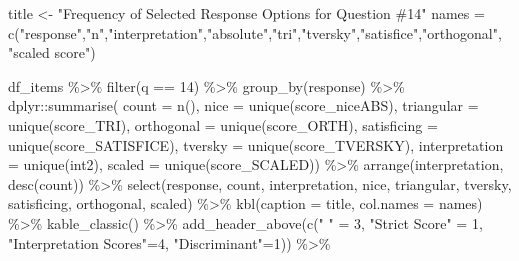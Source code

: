 \documentclass[
  letterpaper,
  DIV=11,
  numbers=noendperiod]{scrreprt}
\newenvironment{Shaded}{\begin{snugshade}}{\end{snugshade}}
\newcommand{\AttributeTok}[1]{\textcolor[rgb]{0.40,0.45,0.13}{#1}}
\newcommand{\DecValTok}[1]{\textcolor[rgb]{0.68,0.00,0.00}{#1}}
\newcommand{\FunctionTok}[1]{\textcolor[rgb]{0.28,0.35,0.67}{#1}}
\newcommand{\NormalTok}[1]{\textcolor[rgb]{0.00,0.23,0.31}{#1}}
\newcommand{\OtherTok}[1]{\textcolor[rgb]{0.00,0.23,0.31}{#1}}
\newcommand{\SpecialCharTok}[1]{\textcolor[rgb]{0.37,0.37,0.37}{#1}}
\newcommand{\StringTok}[1]{\textcolor[rgb]{0.13,0.47,0.30}{#1}}
\begin{document}
\begin{Shaded}
\begin{Highlighting}[]
\NormalTok{title }\OtherTok{\textless{}{-}} \StringTok{"Frequency of Selected Response Options for Question \#14"}
\NormalTok{names }\OtherTok{=} \FunctionTok{c}\NormalTok{(}\StringTok{"response"}\NormalTok{,}\StringTok{"n"}\NormalTok{,}\StringTok{"interpretation"}\NormalTok{,}\StringTok{"absolute"}\NormalTok{,}\StringTok{"tri"}\NormalTok{,}\StringTok{"tversky"}\NormalTok{,}\StringTok{"satisfice"}\NormalTok{,}\StringTok{"orthogonal"}\NormalTok{, }\StringTok{"scaled score"}\NormalTok{)}

\NormalTok{df\_items }\SpecialCharTok{\%\textgreater{}\%} \FunctionTok{filter}\NormalTok{(q }\SpecialCharTok{==} \DecValTok{14}\NormalTok{) }\SpecialCharTok{\%\textgreater{}\%} \FunctionTok{group\_by}\NormalTok{(response) }\SpecialCharTok{\%\textgreater{}\%}
\NormalTok{  dplyr}\SpecialCharTok{::}\FunctionTok{summarise}\NormalTok{( }\AttributeTok{count =} \FunctionTok{n}\NormalTok{(),}
                    \AttributeTok{nice =} \FunctionTok{unique}\NormalTok{(score\_niceABS),}
                    \AttributeTok{triangular =} \FunctionTok{unique}\NormalTok{(score\_TRI),}
                    \AttributeTok{orthogonal =}  \FunctionTok{unique}\NormalTok{(score\_ORTH),}
                    \AttributeTok{satisficing =}  \FunctionTok{unique}\NormalTok{(score\_SATISFICE),}
                    \AttributeTok{tversky =} \FunctionTok{unique}\NormalTok{(score\_TVERSKY),}
                    \AttributeTok{interpretation =} \FunctionTok{unique}\NormalTok{(int2),}
                    \AttributeTok{scaled =} \FunctionTok{unique}\NormalTok{(score\_SCALED)) }\SpecialCharTok{\%\textgreater{}\%}
  \FunctionTok{arrange}\NormalTok{(interpretation, }\FunctionTok{desc}\NormalTok{(count)) }\SpecialCharTok{\%\textgreater{}\%}
  \FunctionTok{select}\NormalTok{(response, count, interpretation, nice,}
\NormalTok{         triangular, tversky, satisficing, orthogonal, scaled) }\SpecialCharTok{\%\textgreater{}\%}
  \FunctionTok{kbl}\NormalTok{(}\AttributeTok{caption =}\NormalTok{ title, }\AttributeTok{col.names =}\NormalTok{ names) }\SpecialCharTok{\%\textgreater{}\%}  \FunctionTok{kable\_classic}\NormalTok{() }\SpecialCharTok{\%\textgreater{}\%}
  \FunctionTok{add\_header\_above}\NormalTok{(}\FunctionTok{c}\NormalTok{(}\StringTok{" "} \OtherTok{=} \DecValTok{3}\NormalTok{, }\StringTok{"Strict Score"} \OtherTok{=} \DecValTok{1}\NormalTok{, }\StringTok{"Interpretation Scores"}\OtherTok{=}\DecValTok{4}\NormalTok{, }\StringTok{"Discriminant"}\OtherTok{=}\DecValTok{1}\NormalTok{)) }\SpecialCharTok{\%\textgreater{}\%}

\end{Highlighting}
\end{Shaded}
\end{document}
